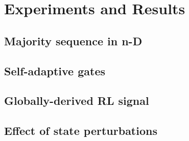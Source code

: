 \section{Experiments and Results}\label{s:results}


\subsection{Majority sequence in n-D}





\subsection{Self-adaptive gates}


\subsection{Globally-derived RL signal}


\subsection{Effect of state perturbations} %






